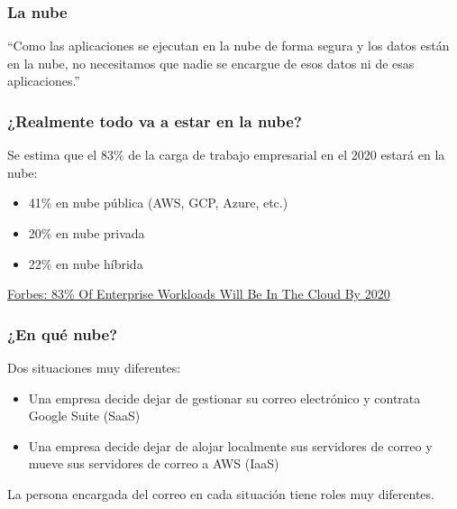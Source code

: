 \documentclass[aspectratio=169]{beamer}
\begin{document}
{
\begin{frame}
  \frametitle{La nube}
  ``Como las aplicaciones se ejecutan en la nube de forma segura y los
  datos están en la nube, no necesitamos que nadie se encargue de esos
  datos ni de esas aplicaciones.''
\end{frame}
}

\begin{frame}
  \frametitle{¿Realmente todo va a estar en la nube?}
  Se estima que el 83\% de la carga de trabajo empresarial en el 2020 estará en la nube:
  \begin{itemize}
  \item 41\% en nube pública (AWS, GCP, Azure, etc.)
  \item 20\% en nube privada
  \item 22\% en nube híbrida
  \end{itemize}
  \href{https://www.forbes.com/sites/louiscolumbus/2018/01/07/83-of-enterprise-workloads-will-be-in-the-cloud-by-202\
0/}{Forbes: 83\% Of Enterprise Workloads Will Be In The Cloud By 2020}
\end{frame}

\begin{frame}
  \frametitle{¿En qué nube?}
  Dos situaciones muy diferentes:
  \begin{itemize}
  \item Una empresa decide dejar de gestionar su correo electrónico y
    contrata Google Suite (SaaS)
  \item Una empresa decide dejar de alojar localmente sus servidores
    de correo y mueve sus servidores de correo a AWS (IaaS)
  \end{itemize}
  La persona encargada del correo en cada situación tiene roles muy diferentes.
\end{frame}
\end{document}
